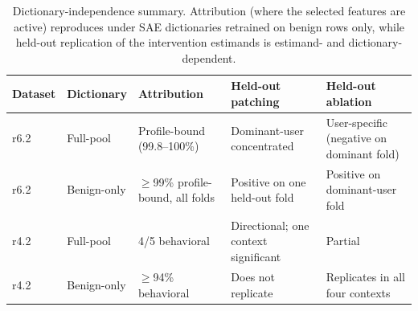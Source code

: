 \begin{table}[htbp]
\caption{Dictionary-independence summary. Attribution (where the selected features are active) reproduces under SAE dictionaries retrained on benign rows only, while held-out replication of the intervention estimands is estimand- and dictionary-dependent.}
\label{tab:dict_robustness}
\centering
\footnotesize
\begin{tabular}{llp{3.4cm}p{3.6cm}p{3.6cm}}
\toprule
Dataset & Dictionary & Attribution & Held-out patching & Held-out ablation \\
\midrule
r6.2 & Full-pool & Profile-bound (99.8--100\%) & Dominant-user concentrated & User-specific (negative on dominant fold) \\
r6.2 & Benign-only & $\geq$99\% profile-bound, all folds & Positive on one held-out fold & Positive on dominant-user fold \\
\midrule
r4.2 & Full-pool & 4/5 behavioral & Directional; one context significant & Partial \\
r4.2 & Benign-only & $\geq$94\% behavioral & Does not replicate & Replicates in all four contexts \\
\bottomrule
\end{tabular}
\end{table}
